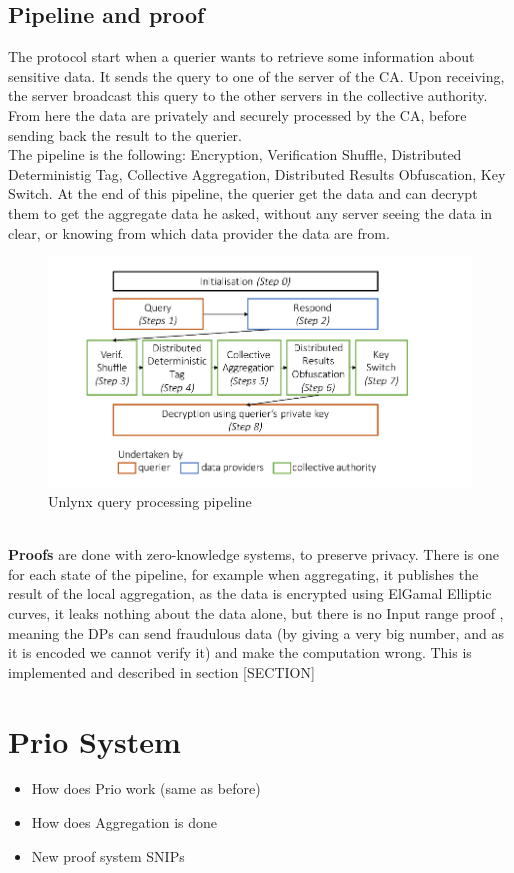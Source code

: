 \documentclass{article}
\begin{document}
\subsection{Pipeline and proof}
The protocol start when a querier wants to retrieve some information about sensitive data. It sends the query to one of the server of the CA. Upon receiving, the server broadcast this query to the other servers in the collective authority.\\
From here the data are privately and securely processed by the CA, before sending back the result to the querier.\\
The pipeline is the following: Encryption, Verification Shuffle, Distributed Deterministig Tag, Collective Aggregation, Distributed Results Obfuscation, Key Switch. At the end of this pipeline, the querier get the data and can decrypt them to get the aggregate data he asked, without any server seeing the data in clear, or knowing from which data provider the data are from.
\begin{figure}[h]
\centering
\includegraphics[scale=0.5]{unlynxPip.png}
\caption{Unlynx query processing pipeline}
\end{figure}
\\
\textbf{Proofs} are done with zero-knowledge systems, to preserve privacy. There is one for each state of the pipeline, for example when aggregating, it publishes the result of the local aggregation, as the data is encrypted using ElGamal Elliptic curves, it leaks nothing about the data alone, but there is no Input range proof , meaning the DPs can send fraudulous data (by giving a very big number, and as it is encoded we cannot verify it) and make the computation wrong. This is implemented and described in section [SECTION]\\

\section{Prio System}
\begin{itemize}
\item How does Prio work (same as before)
\item How does Aggregation is done
\item New proof system SNIPs
\end{itemize}
\end{document}

